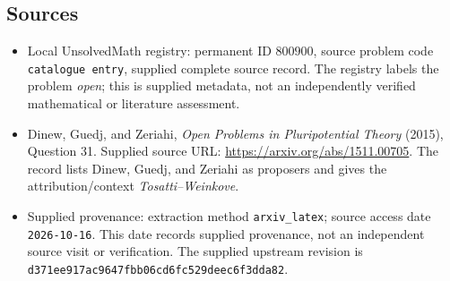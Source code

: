 \documentclass[11pt]{article}
\begin{document}
\subsection{Sources}
\begin{itemize}
\item Local UnsolvedMath registry: permanent ID \(800900\), source problem code \texttt{catalogue entry}, supplied complete source record. The registry labels the problem \emph{open}; this is supplied metadata, not an independently verified mathematical or literature assessment.
\item Dinew, Guedj, and Zeriahi, \emph{Open Problems in Pluripotential Theory} (2015), Question 31. Supplied source URL: \url{https://arxiv.org/abs/1511.00705}. The record lists Dinew, Guedj, and Zeriahi as proposers and gives the attribution/context \emph{Tosatti--Weinkove}.
\item Supplied provenance: extraction method \texttt{arxiv\_latex}; source access date \texttt{2026-10-16}. This date records supplied provenance, not an independent source visit or verification. The supplied upstream revision is \texttt{d371ee917ac9647fbb06cd6fc529deec6f3dda82}.
\end{itemize}
\end{document}
